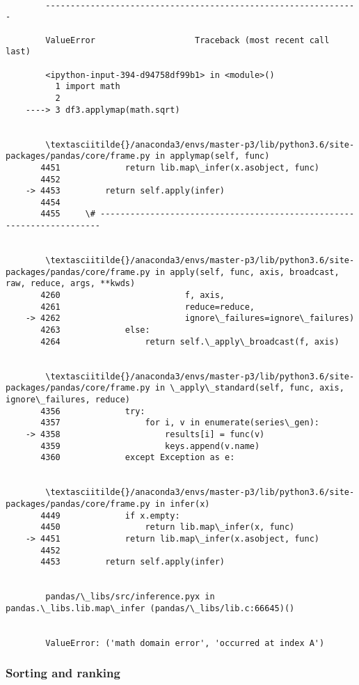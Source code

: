 \documentclass[11pt]{article}
\begin{document}
    \begin{Verbatim}[commandchars=\\\{\}]

        ---------------------------------------------------------------

        ValueError                    Traceback (most recent call last)

        <ipython-input-394-d94758df99b1> in <module>()
          1 import math
          2 
    ----> 3 df3.applymap(math.sqrt)
    

        \textasciitilde{}/anaconda3/envs/master-p3/lib/python3.6/site-packages/pandas/core/frame.py in applymap(self, func)
       4451             return lib.map\_infer(x.asobject, func)
       4452 
    -> 4453         return self.apply(infer)
       4454 
       4455     \# ----------------------------------------------------------------------


        \textasciitilde{}/anaconda3/envs/master-p3/lib/python3.6/site-packages/pandas/core/frame.py in apply(self, func, axis, broadcast, raw, reduce, args, **kwds)
       4260                         f, axis,
       4261                         reduce=reduce,
    -> 4262                         ignore\_failures=ignore\_failures)
       4263             else:
       4264                 return self.\_apply\_broadcast(f, axis)


        \textasciitilde{}/anaconda3/envs/master-p3/lib/python3.6/site-packages/pandas/core/frame.py in \_apply\_standard(self, func, axis, ignore\_failures, reduce)
       4356             try:
       4357                 for i, v in enumerate(series\_gen):
    -> 4358                     results[i] = func(v)
       4359                     keys.append(v.name)
       4360             except Exception as e:


        \textasciitilde{}/anaconda3/envs/master-p3/lib/python3.6/site-packages/pandas/core/frame.py in infer(x)
       4449             if x.empty:
       4450                 return lib.map\_infer(x, func)
    -> 4451             return lib.map\_infer(x.asobject, func)
       4452 
       4453         return self.apply(infer)


        pandas/\_libs/src/inference.pyx in pandas.\_libs.lib.map\_infer (pandas/\_libs/lib.c:66645)()


        ValueError: ('math domain error', 'occurred at index A')

    \end{Verbatim}

    \subsubsection{Sorting and ranking}\label{sorting-and-ranking}
\end{document}
